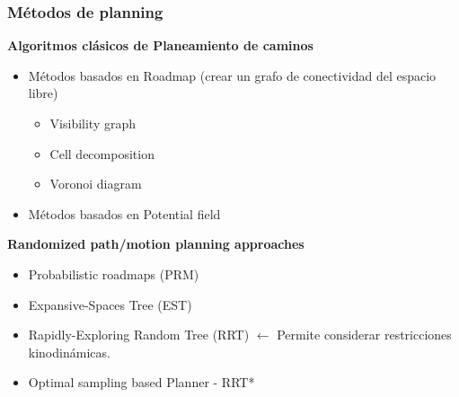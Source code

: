 \begin{frame}
	\frametitle{Métodos de planning}
	
	{\bf Algoritmos clásicos de Planeamiento de caminos}
	
	\begin{itemize}
		\item Métodos basados en Roadmap (crear un grafo de conectividad del espacio libre)
		\begin{itemize}
			\item Visibility graph
			\item Cell decomposition
			\item Voronoi diagram
		\end{itemize}
		\item Métodos basados en Potential field
	\end{itemize}

	{\bf Randomized path/motion planning approaches}
	\begin{itemize}
		\item Probabilistic roadmaps (PRM)
		\item Expansive-Spaces Tree (EST)
		\item Rapidly-Exploring Random Tree (RRT) $\leftarrow$ Permite considerar restricciones kinodinámicas.
		\item Optimal sampling based Planner - RRT*
	\end{itemize}
\end{frame}

